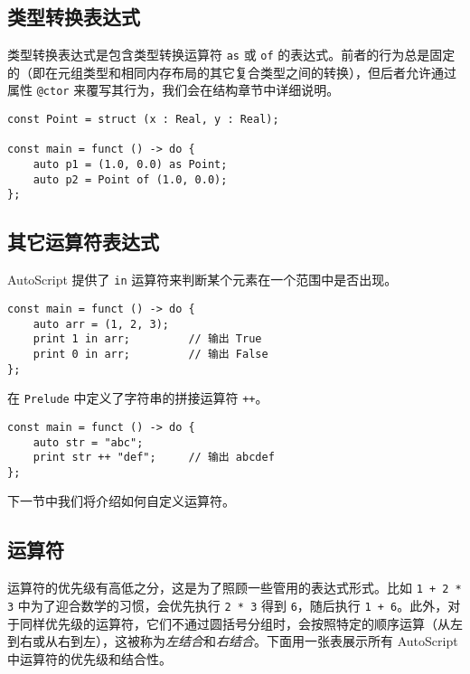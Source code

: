 \subsection{类型转换表达式}

类型转换表达式是包含类型转换运算符 \lstinline!as! 或 \lstinline!of! 的表达式。前者的行为总是固定的（即在元组类型和相同内存布局的其它复合类型之间的转换），但后者允许通过属性 \lstinline!@ctor! 来覆写其行为，我们会在结构章节中详细说明。

\begin{lstlisting}
const Point = struct (x : Real, y : Real);

const main = funct () -> do {
    auto p1 = (1.0, 0.0) as Point;
    auto p2 = Point of (1.0, 0.0);
};
\end{lstlisting}


\subsection{其它运算符表达式}

AutoScript 提供了 \lstinline!in! 运算符来判断某个元素在一个范围中是否出现。

\begin{lstlisting}
const main = funct () -> do {
    auto arr = (1, 2, 3);
    print 1 in arr;         // 输出 True
    print 0 in arr;         // 输出 False
};
\end{lstlisting}

在 \lstinline!Prelude! 中定义了字符串的拼接运算符 \lstinline!++!。

\begin{lstlisting}
const main = funct () -> do {
    auto str = "abc";
    print str ++ "def";     // 输出 abcdef
};
\end{lstlisting}

下一节中我们将介绍如何自定义运算符。


\subsection{运算符}

运算符的优先级有高低之分，这是为了照顾一些管用的表达式形式。比如 \lstinline!1 + 2 * 3! 中为了迎合数学的习惯，会优先执行 \lstinline!2 * 3! 得到 \lstinline!6!，随后执行 \lstinline!1 + 6!。此外，对于同样优先级的运算符，它们不通过圆括号分组时，会按照特定的顺序运算（从左到右或从右到左），这被称为\emph{左结合}和\emph{右结合}。下面用一张表展示所有 AutoScript 中运算符的优先级和结合性。


